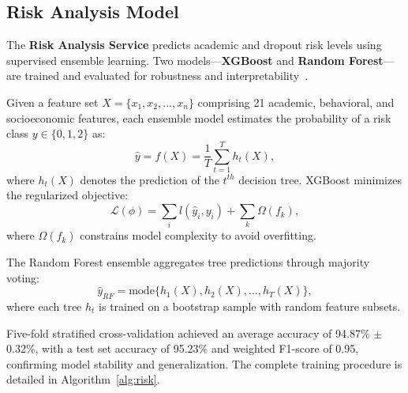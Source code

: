 \documentclass[conference]{IEEEtran}
\begin{document}
\subsection{Risk Analysis Model}
The \textbf{Risk Analysis Service} predicts academic and dropout risk levels using supervised ensemble learning. Two models—\textbf{XGBoost} and \textbf{Random Forest}—are trained and evaluated for robustness and interpretability~\cite{ref41}.

Given a feature set $X = \{x_1, x_2, ..., x_n\}$ comprising 21 academic, behavioral, and socioeconomic features, each ensemble model estimates the probability of a risk class $y \in \{0,1,2\}$ as:
\begin{equation}
    \hat{y} = f(X) = \frac{1}{T}\sum_{t=1}^{T}h_t(X),
\end{equation}
where $h_t(X)$ denotes the prediction of the $t^{th}$ decision tree.  
XGBoost minimizes the regularized objective:
\begin{equation}
    \mathcal{L}(\phi) = \sum_i l(\hat{y}_i, y_i) + \sum_k \Omega(f_k),
\end{equation}
where $\Omega(f_k)$ constrains model complexity to avoid overfitting.  

The Random Forest ensemble aggregates tree predictions through majority voting:
\begin{equation}
    \hat{y}_{RF} = \text{mode}\{h_1(X), h_2(X), ..., h_T(X)\},
\end{equation}
where each tree $h_t$ is trained on a bootstrap sample with random feature subsets.

Five-fold stratified cross-validation achieved an average accuracy of 94.87\% $\pm$ 0.32\%, with a test set accuracy of 95.23\% and weighted F1-score of 0.95, confirming model stability and generalization. The complete training procedure is detailed in Algorithm~\ref{alg:risk}.
\end{document}
